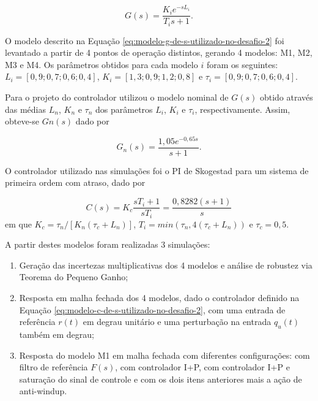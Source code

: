 \begin{equation}
    \label{eq:modelo-g-de-s-utilizado-no-desafio-2}
    G(s) = \frac{K_{i}e^{-sL_{i}}}{T_{i}s + 1}.
\end{equation}

O modelo descrito na Equação \ref{eq:modelo-g-de-s-utilizado-no-desafio-2} foi
levantado a partir de 4 pontos de operação distintos, gerando 4 modelos: M1, M2,
M3 e M4. Os parâmetros obtidos para cada modelo $i$ foram os seguintes: $L_{i} =
[0,9; 0,7; 0,6; 0,4]$, $K_{i} = [1,3; 0,9; 1,2; 0,8]$ e $\tau_{i} = [0,9; 0,7;
0,6; 0,4]$.

Para o projeto do controlador utilizou o modelo nominal de $G(s)$ obtido
através das médias $L_{n}$, $K_{n}$ e $\tau_{n}$ dos parâmetros $L_{i}$, $K_{i}$
e $\tau_{i}$, respectivamente. Assim, obteve-se $G{n}(s)$ dado por

\begin{equation}
    \label{eq:modelo-gn-de-s-utilizado-no-desafio-2}
    G_{n}(s) = \frac{1,05e^{-0,65s}}{s + 1}.
\end{equation}

O controlador utilizado nas simulações foi o PI de Skogestad para um sistema de
primeira ordem com atraso, dado por

\begin{equation}
    \label{eq:modelo-c-de-s-utilizado-no-desafio-2}
    C(s) = K_{c}\frac{sT_{i} + 1}{sT_{i}} = \frac{0,8282(s + 1)}{s}
\end{equation}
em que $K_{c} = \tau_{n}/[K_{n}(\tau_{c} + L_{n})]$, $T_{i} = min(\tau_{n},
4(\tau_{c} + L_{n}))$ e $\tau_{c} = 0,5$. 

A partir destes modelos foram realizadas 3 simulações:
\begin{enumerate}
    \item Geração das incertezas multiplicativas dos 4 modelos e análise de
    robustez via Teorema do Pequeno Ganho;
    \item Resposta em malha fechada dos 4 modelos, dado o controlador definido
    na Equação \ref{eq:modelo-c-de-s-utilizado-no-desafio-2}, com uma entrada de
    referência $r(t)$ em degrau unitário e uma perturbação na entrada $q_{u}(t)$
    também em degrau;
    \item Resposta do modelo M1 em malha fechada com diferentes configurações:
    com filtro de referência $F(s)$, com controlador I+P, com controlador I+P e
    saturação do sinal de controle e com os dois itens anteriores mais a ação de
    anti-windup.
\end{enumerate}

